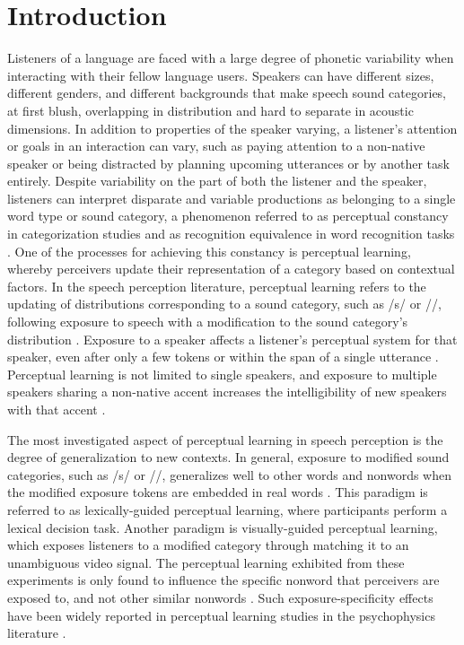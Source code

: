 
\chapter{Introduction}

Listeners of a language are faced with a large degree of phonetic variability when interacting with their fellow language users.  
Speakers can have different sizes, different genders, and different backgrounds that make speech sound categories, at first blush, overlapping in distribution and hard to separate in acoustic dimensions.
In addition to properties of the speaker varying, a listener's attention or goals in an interaction can vary, such as paying attention to a non-native speaker or being distracted by planning upcoming utterances or by another task entirely.  
Despite variability on the part of both the listener and the speaker, listeners can interpret disparate and variable productions as belonging to a single word type or sound category, a phenomenon referred to as perceptual constancy in categorization studies \citep{Shankweiler1977, Kuhl1979} and as recognition equivalence in word recognition tasks \citep{Sumner2013}.
One of the processes for achieving this constancy is perceptual learning, whereby perceivers update their representation of a category based on contextual factors.
In the speech perception literature, perceptual learning refers to the updating of distributions corresponding to a sound category, such as /s/ or /\textesh/, following exposure to speech with a modification to the sound category's distribution \citep{Norris2003}.
Exposure to a speaker affects a listener's perceptual system for that speaker,  even after only a few tokens \citep{Vroomen2007, Kraljic2008} or within the span of a single utterance \citep{Ladefoged1957}.
Perceptual learning is not limited to single speakers, and exposure to multiple speakers sharing a non-native accent increases the intelligibility of new speakers with that accent \citep{Bradlow2008}.

The most investigated aspect of perceptual learning in speech perception is the degree of generalization to new contexts.
In general, exposure to modified sound categories, such as /s/ or /\textesh/, generalizes well to other words and nonwords when the modified exposure tokens are embedded in real words \citep{Norris2003, Reinisch2013}.  
This paradigm is referred to as lexically-guided perceptual learning, where participants perform a lexical decision task.
Another paradigm is visually-guided perceptual learning, which exposes listeners to a modified category through matching it to an unambiguous video signal.  
The perceptual learning exhibited from these experiments is only found to influence the specific nonword that perceivers are exposed to, and not other similar nonwords \citep{Reinisch2014}.  
Such exposure-specificity effects have been widely reported in perceptual learning studies in the psychophysics literature \citep{Gibson1953}.

